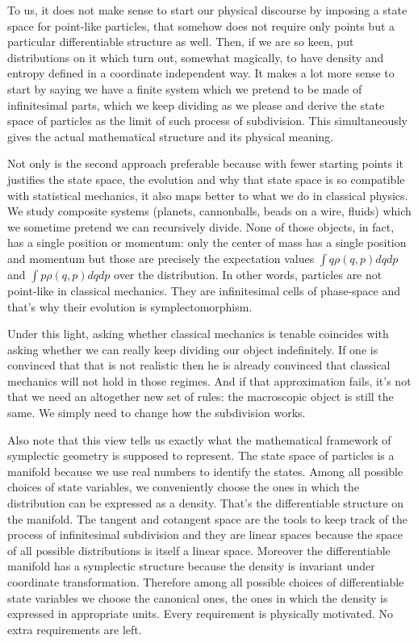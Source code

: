 \documentclass[11pt]{article}
\begin{document}
To us, it does not make sense to start our physical discourse by imposing a state space for point-like particles, that somehow does not require only points but a particular differentiable structure as well. Then, if we are so keen, put distributions on it which turn out, somewhat magically, to have density and entropy defined in a coordinate independent way. It makes a lot more sense to start by saying we have a finite system which we pretend to be made of infinitesimal parts, which we keep dividing as we please and derive the state space of particles as the limit of such process of subdivision. This simultaneously gives the actual mathematical structure and its physical meaning.

Not only is the second approach preferable because with fewer starting points it justifies the state space, the evolution and why that state space is so compatible with statistical mechanics, it also maps better to what we do in classical physics. We study composite systems (planets, cannonballs, beads on a wire, fluids) which we sometime pretend we can recursively divide. None of those objects, in fact, has a single position or momentum: only the center of mass has a single position and momentum but those are precisely the expectation values $\int q \rho(q,p) dq dp$ and $\int p \rho(q,p) dq dp$ over the distribution. In other words, particles are not point-like in classical mechanics. They are infinitesimal cells of phase-space and that's why their evolution is symplectomorphism.

Under this light, asking whether classical mechanics is tenable coincides with asking whether we can really keep dividing our object indefinitely. If one is convinced that that is not realistic then he is already convinced that classical mechanics will not hold in those regimes. And if that approximation fails, it's not that we need an altogether new set of rules: the macroscopic object is still the same. We simply need to change how the subdivision works.

Also note that this view tells us exactly what the mathematical framework of symplectic geometry is supposed to represent. The state space of particles is a manifold because we use real numbers to identify the states. Among all possible choices of state variables, we conveniently choose the ones in which the distribution can be expressed as a density. That's the differentiable structure on the manifold. The tangent and cotangent space are the tools to keep track of the process of infinitesimal subdivision and they are linear spaces because the space of all possible distributions is itself a linear space. Moreover the differentiable manifold has a symplectic structure because the density is invariant under coordinate transformation. Therefore among all possible choices of differentiable state variables we choose the canonical ones, the ones in which the density is expressed in appropriate units. Every requirement is physically motivated. No extra requirements are left.
\end{document}
